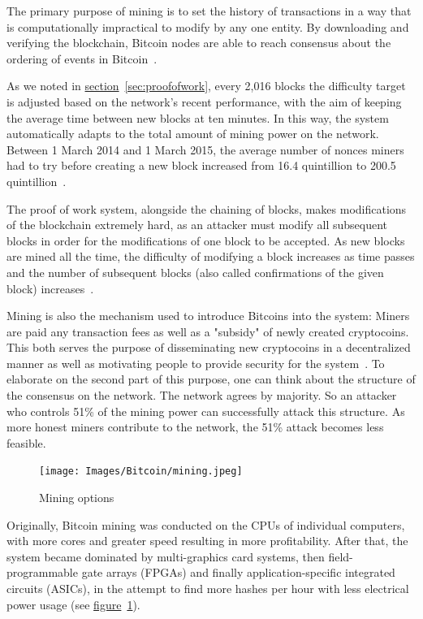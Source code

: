 The primary purpose of mining is to set the history of transactions in a way that is computationally impractical to modify by any one entity. By downloading and verifying the blockchain, Bitcoin nodes are able to reach consensus about the ordering of events in Bitcoin~\cite{wiki}.

As we noted in \hyperref[sec:proofofwork]{section}~\ref{sec:proofofwork}, every 2,016 blocks the difficulty target is adjusted based on the network's recent performance, with the aim of keeping the average time between new blocks at ten minutes. In this way, the system automatically adapts to the total amount of mining power on the network. Between 1 March 2014 and 1 March 2015, the average number of nonces miners had to try before creating a new block increased from 16.4 quintillion to 200.5 quintillion~\cite{difficulty_history}.

The proof of work system, alongside the chaining of blocks, makes modifications of the blockchain extremely hard, as an attacker must modify all subsequent blocks in order for the modifications of one block to be accepted. As new blocks are mined all the time, the difficulty of modifying a block increases as time passes and the number of subsequent blocks (also called confirmations of the given block) increases~\cite{economist}.

Mining is also the mechanism used to introduce Bitcoins into the system: Miners are paid any transaction fees as well as a "subsidy" of newly created cryptocoins. This both serves the purpose of disseminating new cryptocoins in a decentralized manner as well as motivating people to provide security for the system~\cite{wiki}. To elaborate on the second part of this purpose, one can think about the structure of the consensus on the network. The network agrees by majority. So an attacker who controls 51\% of the mining power can successfully attack this structure. As more honest miners contribute to the network, the 51\% attack becomes less feasible.

\begin{figure}
  \centering
  \texttt{[image: Images/Bitcoin/mining.jpeg]}
  \caption{Mining options}
  \label{fig:mining}
\end{figure}
Originally, Bitcoin mining was conducted on the CPUs of individual computers, with more cores and greater speed resulting in more profitability. After that, the system became dominated by multi-graphics card systems, then field-programmable gate arrays (FPGAs) and finally application-specific integrated circuits (ASICs), in the attempt to find more hashes per hour with less electrical power usage (see \hyperref[fig:mining]{figure}~\ref{fig:mining}).

